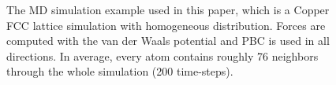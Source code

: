 \documentclass[preprint,12pt]{elsarticle}
\begin{document}
\begin{figure}[tb]
    \centering
    \caption{The MD simulation example used in this paper, which is a Copper FCC lattice simulation with homogeneous distribution. Forces are computed with the van der Waals potential and PBC is used in all directions. In average, every atom contains roughly 76 neighbors through the whole simulation (200 time-steps).}
    \label{fig:copper_fcc_lattice}
\end{figure}
\end{document}
